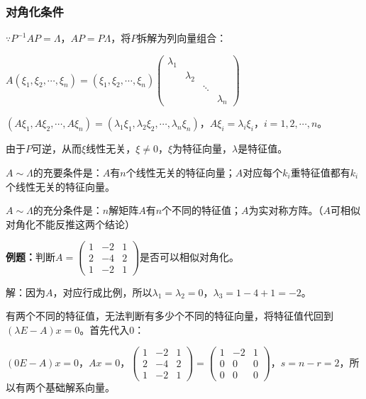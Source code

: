 \documentclass[UTF8, 12pt]{ctexart}
\begin{document}
\subsubsection{对角化条件}

$\because P^{-1}AP=\Lambda$，$AP=P\Lambda$，将$P$拆解为列向量组合：

$A(\xi_1,\xi_2,\cdots,\xi_n)=(\xi_1,\xi_2,\cdots,\xi_n)\left(\begin{array}{cccc}
    \lambda_1 \\
     & \lambda_2 \\
     & & \ddots \\
     & & & \lambda_n
\end{array}\right)$

$(A\xi_1,A\xi_2,\cdots,A\xi_n)=(\lambda_1\xi_1,\lambda_2\xi_2,\cdots,\lambda_n\xi_n)$，$A\xi_i=\lambda_i\xi_i$，$i=1,2,\cdots,n$。

由于$P$可逆，从而$\xi$线性无关，$\xi\neq0$，$\xi$为特征向量，$\lambda$是特征值。

$A\sim\Lambda$的充要条件是：$A$有$n$个线性无关的特征向量；$A$对应每个$k_i$重特征值都有$k_i$个线性无关的特征向量。

$A\sim\Lambda$的充分条件是：$n$解矩阵$A$有$n$个不同的特征值；$A$为实对称方阵。（$A$可相似对角化不能反推这两个结论）

\textbf{例题：}判断$A=\left(\begin{array}{ccc}
    1 & -2 & 1 \\
    2 & -4 & 2 \\
    1 & -2 & 1
\end{array}\right)$是否可以相似对角化。

解：因为$A$，对应行成比例，所以$\lambda_1=\lambda_2=0$，$\lambda_3=1-4+1=-2$。

有两个不同的特征值，无法判断有多少个不同的特征向量，将特征值代回到$(\lambda E-A)x=0$。首先代入0：

$(0E-A)x=0$，$Ax=0$，$\left(\begin{array}{ccc}
    1 & -2 & 1 \\
    2 & -4 & 2 \\
    1 & -2 & 1
\end{array}\right)=\left(\begin{array}{ccc}
    1 & -2 & 1 \\
    0 & 0 & 0 \\
    0 & 0 & 0
\end{array}\right)$，$s=n-r=2$，所以有两个基础解系向量。
\end{document}
